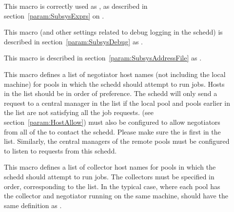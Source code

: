 \begin{description}
\item[] \label{param:ScheddExprs} This macro is
  correctly used as , as described in
  section~\ref{param:SubsysExprs} on .

\item[] \label{param:ScheddDebug} This macro
  (and other settings related to debug logging in the schedd) is
  described in section~\ref{param:SubsysDebug} as
  .

\item[] \label{param:ScheddAddressFile}
  This macro is described in
  section~\ref{param:SubsysAddressFile} as
  . 

\item[] \label{param:FlockNegotiatorHosts} 
  This macro defines a list of negotiator host names (not including the
  local  machine) for pools in which the
  schedd should attempt to run jobs.  Hosts in the list should be in
  order of preference.  The schedd will only send a request to a
  central manager in the list if the local pool and pools earlier in
  the list are not satisfying all the job requests.
   (see
  section~\ref{param:HostAllow}) must also be configured to allow
  negotiators from all of the  to
  contact the schedd.  Please make sure the
   is first in the
   list.  Similarly, the
  central managers of the remote pools must be configured to listen to
  requests from this schedd.

\item[] \label{param:FLockCollectorHosts}
  This macro defines a list of collector host names for pools in which
  the schedd should attempt to run jobs.  The
  collectors must be specified in order, corresponding to the
   list.  In the typical case, where each pool
  has the collector and negotiator running on the same machine,
   should have the same definition as
  .



\end{description}
